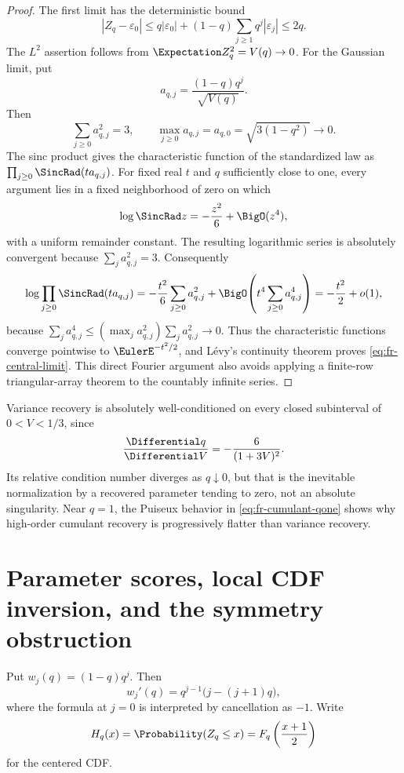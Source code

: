 \begin{proof}
The first limit has the deterministic bound
\[
 |Z_q-\varepsilon_0|
 \le q|\varepsilon_0|+(1-q)\sum_{j\ge1}q^j|\varepsilon_j|\le2q.
\]
The \(L^2\) assertion follows from
\(\Expectation Z_q^2=V(q)\to0\).  For the Gaussian limit, put
\[
 a_{q,j}=\frac{(1-q)q^j}{\sqrt{V(q)}}.
\]
Then
\[
 \sum_{j\ge0}a_{q,j}^2=3,
 \qquad \max_{j\ge0}a_{q,j}=a_{q,0}
 =\sqrt{3(1-q^2)}\longrightarrow0.
\]
The sinc product gives the characteristic function of the standardized law as
\(\prod_{j\ge0}\SincRad(t a_{q,j})\).  For fixed real \(t\) and \(q\) sufficiently
close to one, every argument lies in a fixed neighborhood of zero on which
\[
 \log\SincRad z=-\frac{z^2}{6}+\BigO(z^4),
\]
with a uniform remainder constant.  The resulting logarithmic series is
absolutely convergent because \(\sum_j a_{q,j}^2=3\).  Consequently
\[
 \log\prod_{j\ge0}\SincRad(t a_{q,j})
 =-\frac{t^2}{6}\sum_{j\ge0}a_{q,j}^2
  +\BigO\!\left(t^4\sum_{j\ge0}a_{q,j}^4\right)
 =-\frac{t^2}{2}+o(1),
\]
because
\(\sum_j a_{q,j}^4\le(\max_j a_{q,j}^2)\sum_j a_{q,j}^2\to0\).
Thus the characteristic functions converge pointwise to \(\EulerE^{-t^2/2}\),
and L\'evy's continuity theorem proves \cref{eq:fr-central-limit}.  This direct
Fourier argument also avoids applying a finite-row triangular-array theorem to
the countably infinite series.
\end{proof}

Variance recovery is absolutely well-conditioned on every closed
subinterval of \(0<V<1/3\), since
\[
 \frac{\Differential q}{\Differential V}=-\frac6{(1+3V)^2}.
\]
Its relative condition number diverges as \(q\downarrow0\), but that is the
inevitable normalization by a recovered parameter tending to zero, not an
absolute singularity.  Near \(q=1\), the Puiseux behavior in
\cref{eq:fr-cumulant-qone} shows why high-order cumulant recovery is
progressively flatter than variance recovery.

\section{Parameter scores, local CDF inversion, and the symmetry obstruction}
\label{sec:fr-cdf-inverse}

Put \(w_j(q)=(1-q)q^j\).  Then
\[
 w_j'(q)=q^{j-1}\bigl(j-(j+1)q\bigr),
\]
where the formula at \(j=0\) is interpreted by cancellation as \(-1\).
Write
\[
 H_q(x)=\Probability(Z_q\le x)=F_q\left(\frac{x+1}{2}\right)
\]
for the centered CDF.


